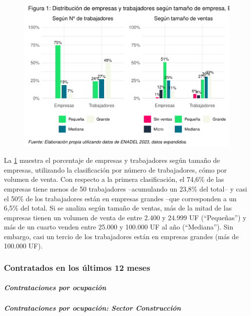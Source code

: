 \documentclass[
]{article}
\begin{document}
\begin{figure}[H]

\begin{center}\includegraphics{Reporte_files/figure-latex/unnamed-chunk-3-1} \end{center}

\label{fig:tamano-empresa}\end{figure}

La \ref{fig:tamano-empresa} muestra el porcentaje de empresas y
trabajadores según tamaño de empresas, utilizando la clasificación por
número de trabajadores, cómo por volumen de venta. Con respecto a la
primera clasificación, el 74,6\% de las empresas tiene menos de 50
trabajadores --acumulando un 23,8\% del total-- y casi el 50\% de los
trabajadores están en empresas grandes --que corresponden a un 6,5\% del
total. Si se analiza según tamaño de ventas, más de la mitad de las
empresas tienen un volumen de venta de entre 2.400 y 24.999 UF
(``Pequeñas'') y más de un cuarto venden entre 25.000 y 100.000 UF al
año (``Mediana''). Sin embargo, casi un tercio de los trabajadores están
en empresas grandes (más de 100.000 UF).

\subsubsection{Contratados en los últimos 12
meses}\label{contratados-en-los-uxfaltimos-12-meses}

\subparagraph{Contrataciones por
ocupación}\label{contrataciones-por-ocupaciuxf3n}

\subparagraph{Contrataciones por ocupación: Sector
Construcción}\label{contrataciones-por-ocupaciuxf3n-sector-construcciuxf3n}
\end{document}
